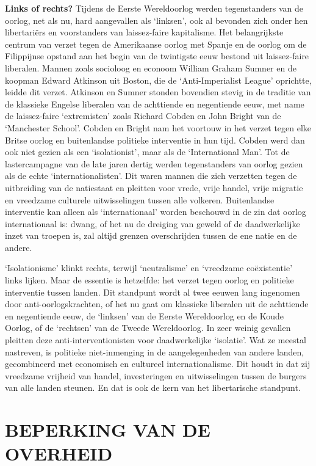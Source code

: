 \documentclass[
  a5paper,
  smalldemyvopaper,10pt,twoside,onecolumn,openright,extrafontsizes,hidelinks]{memoir}
\begin{document}
\textbf{Links of rechts?} Tijdens de Eerste Wereldoorlog werden
tegenstanders van de oorlog, net als nu, hard aangevallen als `linksen',
ook al bevonden zich onder hen libertariërs en voorstanders van
laissez-faire kapitalisme. Het belangrijkste centrum van verzet tegen de
Amerikaanse oorlog met Spanje en de oorlog om de Filippijnse opstand aan
het begin van de twintigste eeuw bestond uit laissez-faire liberalen.
Mannen zoals socioloog en econoom William Graham Sumner en de koopman
Edward Atkinson uit Boston, die de `Anti-Imperialist League' oprichtte,
leidde dit verzet. Atkinson en Sumner stonden bovendien stevig in de
traditie van de klassieke Engelse liberalen van de achttiende en
negentiende eeuw, met name de laissez-faire `extremisten' zoals Richard
Cobden en John Bright van de `Manchester School'. Cobden en Bright nam
het voortouw in het verzet tegen elke Britse oorlog en buitenlandse
politieke interventie in hun tijd. Cobden werd dan ook niet gezien als
een `isolationist', maar als de `International Man'. Tot de
lastercampagne van de late jaren dertig werden tegenstanders van oorlog
gezien als de echte `internationalisten'. Dit waren mannen die zich
verzetten tegen de uitbreiding van de natiestaat en pleitten voor vrede,
vrije handel, vrije migratie en vreedzame culturele uitwisselingen
tussen alle volkeren. Buitenlandse interventie kan alleen als
`internationaal' worden beschouwd in de zin dat oorlog internationaal
is: dwang, of het nu de dreiging van geweld of de daadwerkelijke inzet
van troepen is, zal altijd grenzen overschrijden tussen de ene natie en
de andere.

`Isolationisme' klinkt rechts, terwijl `neutralisme' en `vreedzame
coëxistentie' links lijken. Maar de essentie is hetzelfde: het verzet
tegen oorlog en politieke interventie tussen landen. Dit standpunt wordt
al twee eeuwen lang ingenomen door anti-oorlogskrachten, of het nu gaat
om klassieke liberalen uit de achttiende en negentiende eeuw, de
`linksen' van de Eerste Wereldoorlog en de Koude Oorlog, of de
`rechtsen' van de Tweede Wereldoorlog. In zeer weinig gevallen pleitten
deze anti-interventionisten voor daadwerkelijke `isolatie'. Wat ze
meestal nastreven, is politieke niet-inmenging in de aangelegenheden van
andere landen, gecombineerd met economisch en cultureel
internationalisme. Dit houdt in dat zij vreedzame vrijheid van handel,
investeringen en uitwisselingen tussen de burgers van alle landen
steunen. En dat is ook de kern van het libertarische standpunt.

\section{\texorpdfstring{\textbf{BEPERKING VAN DE
OVERHEID}}{BEPERKING VAN DE OVERHEID}}\label{beperking-van-de-overheid}
\end{document}
